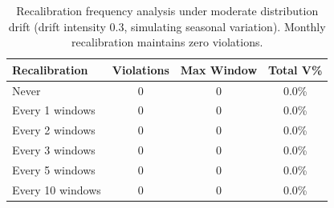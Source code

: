 \begin{table}[t]
\centering
\caption{Recalibration frequency analysis under moderate distribution drift (drift intensity 0.3, simulating seasonal variation). Monthly recalibration maintains zero violations.}
\label{tab:recalibration}
\begin{tabular}{lccc}
\toprule
\textbf{Recalibration} & \textbf{Violations} & \textbf{Max Window} & \textbf{Total V\%} \\
\midrule
Never & 0 & 0 & 0.0\% \\
Every 1 windows & 0 & 0 & 0.0\% \\
Every 2 windows & 0 & 0 & 0.0\% \\
Every 3 windows & 0 & 0 & 0.0\% \\
Every 5 windows & 0 & 0 & 0.0\% \\
Every 10 windows & 0 & 0 & 0.0\% \\
\bottomrule
\end{tabular}
\end{table}